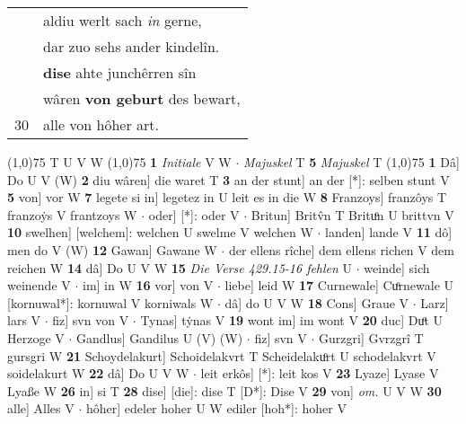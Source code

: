 \documentclass[8pt,a4paper,notitlepage]{article}
\begin{document}
\begin{table}[ht]
\begin{minipage}[t]{0.5\linewidth}
\begin{tabular}{rl}
 & aldiu werlt sach \textit{in} gerne,\\ 
 & dar zuo sehs ander kindelîn.\\ 
 & \textbf{dise} ahte junchêrren sîn\\ 
 & wâren \textbf{von geburt} des bewart,\\ 
30 & alle von hôher art.\\ 
\end{tabular}
\scriptsize
\line(1,0){75} \newline
T U V W \newline
\line(1,0){75} \newline
\textbf{1} \textit{Initiale} V W   $\cdot$ \textit{Majuskel} T  \textbf{5} \textit{Majuskel} T  \newline
\line(1,0){75} \newline
\textbf{1} Dâ] Do U V (W) \textbf{2} diu wâren] die waret T \textbf{3} an der stunt] an der [*]: selben stunt V \textbf{5} von] vor W \textbf{7} legete si in] legetez in U leit es in die W \textbf{8} Franzoys] franzôys T franzoẏs V frantzoys W  $\cdot$ oder] [*]: oder V  $\cdot$ Britun] Britv̂n T Brituͦn U brittvn V \textbf{10} swelhen] [welchem]: welchen U swelme V welchen W  $\cdot$ landen] lande V \textbf{11} dô] men do V (W) \textbf{12} Gawan] Gawane W  $\cdot$ der ellens rîche] dem ellens richen V dem reichen W \textbf{14} dâ] Do U V W \textbf{15} \textit{Die Verse 429.15-16 fehlen} U   $\cdot$ weinde] sich weinende V  $\cdot$ im] in W \textbf{16} vor] von V  $\cdot$ liebe] leid W \textbf{17} Curnewale] Cuͦrnewale U [kornuwal*]: kornuwal V korniwals W  $\cdot$ dâ] do U V W \textbf{18} Cons] Graue V  $\cdot$ Larz] lars V  $\cdot$ fiz] svn von V  $\cdot$ Tynas] tẏnas V \textbf{19} wont im] im wont V \textbf{20} duc] Duͦt U Herzoge V  $\cdot$ Gandlus] Gandilus U (V) (W)  $\cdot$ fiz] svn V  $\cdot$ Gurzgri] Gvrzgrî T gursgri W \textbf{21} Schoydelakurt] Schoidelakvrt T Scheidelakuͦrt U schodelakvrt V soidelakurt W \textbf{22} dâ] Do U V W  $\cdot$ leit erkôs] [*]: leit kos V \textbf{23} Lyaze] Lyase V Lyaße W \textbf{26} in] si T \textbf{28} dise] [die]: dise T [D*]: Dise V \textbf{29} von] \textit{om.} U V W \textbf{30} alle] Alles V  $\cdot$ hôher] edeler hoher U W ediler [hoh*]: hoher V \newline
\end{minipage}
\end{table}
\end{document}
